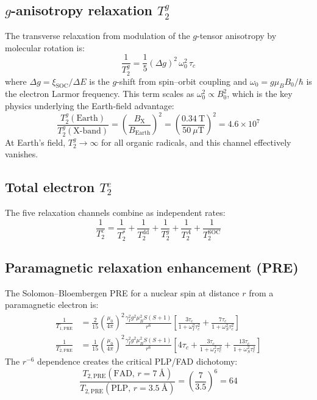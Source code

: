 \documentclass[11pt]{article}
\begin{document}
\subsection{$g$-anisotropy relaxation $T_2^g$}

The transverse relaxation from modulation of the $g$-tensor anisotropy by molecular rotation is\cite{Atkins1972}:
\begin{equation}
\frac{1}{T_2^g} = \frac{1}{5}(\Delta g)^2\,\omega_0^2\,\tau_c
\label{eq:T2g}
\end{equation}
where $\Delta g = \xi_\mathrm{SOC}/\Delta E$ is the $g$-shift from spin--orbit coupling and $\omega_0 = g\mu_B B_0/\hbar$ is the electron Larmor frequency. This term scales as $\omega_0^2 \propto B_0^2$, which is the key physics underlying the Earth-field advantage:
\begin{equation}
\frac{T_2^g(\mathrm{Earth})}{T_2^g(\mathrm{X\text{-}band})} = \left(\frac{B_\mathrm{X}}{B_\mathrm{Earth}}\right)^2 = \left(\frac{0.34~\mathrm{T}}{50~\mu\mathrm{T}}\right)^2 = 4.6 \times 10^7
\end{equation}
At Earth's field, $T_2^g \rightarrow \infty$ for all organic radicals, and this channel effectively vanishes.

\subsection{Total electron $T_2^e$}

The five relaxation channels combine as independent rates:
\begin{equation}
\frac{1}{T_2^e} = \frac{1}{T_2^*} + \frac{1}{T_2^\mathrm{dd}} + \frac{1}{T_2^g} + \frac{1}{T_2^A} + \frac{1}{T_2^\mathrm{SOC}}
\label{eq:T2e_total}
\end{equation}

\subsection{Paramagnetic relaxation enhancement (PRE)}

The Solomon--Bloembergen PRE for a nuclear spin at distance $r$ from a paramagnetic electron is\cite{Solomon1955,Bloembergen1957}:
\begin{align}
\frac{1}{T_{1,\mathrm{PRE}}} &= \frac{2}{15}\left(\frac{\mu_0}{4\pi}\right)^2 \frac{\gamma_I^2 g^2 \mu_B^2 S(S+1)}{r^6} \left[\frac{3\tau_c}{1+\omega_I^2\tau_c^2} + \frac{7\tau_c}{1+\omega_S^2\tau_c^2}\right] \label{eq:PRE_T1}\\[6pt]
\frac{1}{T_{2,\mathrm{PRE}}} &= \frac{1}{15}\left(\frac{\mu_0}{4\pi}\right)^2 \frac{\gamma_I^2 g^2 \mu_B^2 S(S+1)}{r^6} \left[4\tau_c + \frac{3\tau_c}{1+\omega_I^2\tau_c^2} + \frac{13\tau_c}{1+\omega_S^2\tau_c^2}\right] \label{eq:PRE_T2}
\end{align}
The $r^{-6}$ dependence creates the critical PLP/FAD dichotomy:
\begin{equation}
\frac{T_{2,\mathrm{PRE}}(\mathrm{FAD},\,r=7~\text{\AA})}{T_{2,\mathrm{PRE}}(\mathrm{PLP},\,r=3.5~\text{\AA})} = \left(\frac{7}{3.5}\right)^6 = 64
\end{equation}
\end{document}
